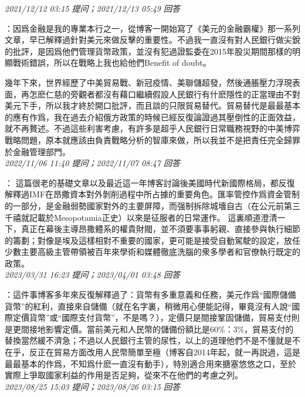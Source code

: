 \documentclass[twocolumn]{ctexart}
\begin{document}
\textit{\hfill\noindent\small 2021/12/12 03:15 提问；2021/12/13 05:49 回答}

：因爲金融是我的專業本行之一，從博客一開始寫了《美元的金融霸權》那一系列文章，早已解釋過針對美元來做反擊的重要性。不過我一直沒有對人民銀行做尖銳的批評，是因爲他們管理貨幣政策，並沒有犯過證監委在2015年股災期間那樣的明顯戰術錯誤，所以在戰略上我也給他們Benefit of doubt。

幾年下來，世界經歷了中美貿易戰、新冠疫情、美聯儲超發，然後通脹壓力浮現表面，再怎麽仁慈的旁觀者都沒有藉口繼續假設人民銀行有什麽隱性的正當理由不對美元下手，所以我才終於開口批評，而且談的只限貿易替代。貿易替代是最最基本的應有作爲，我在過去介紹俄方政策的時候已經反復論證過其壓倒性的正面效益，就不再贅述。不過這些利害考慮，有許多是超乎人民銀行日常職務視野的中美博弈戰略問題，原本就應該由負責戰略分析的智庫來做，所以我並不是把責任完全歸罪於金融管理部門。
\\

\textit{\hfill\noindent\small 2022/11/06 11:40 提问；2022/11/07 08:47 回答}

：
這篇很老的基礎文章以及最近這一年博客討論後美國時代新國際格局，都反復解釋過IMF在昂撒資本對外剝削過程中所占據的重要角色。匯率管控作爲資金管制的一部分，是金融弱勢國家對外的主要屏障，而强制拆除城墻自古（在公元前第三千禧就記載於Mesopotamia正史）以來是征服者的日常運作。
這裏順道澄清一下，真正在幕後主導昂撒體系的權貴財閥，並不須要事事躬親、直接參與執行細節的籌劃；對像是埃及這樣相對不重要的國家，更可能是接受自動駕駛的設定，放任少數主要高級主管帶領被百年來學術和媒體徹底洗腦的衆多學者和官僚執行既定的政策。
\\

\textit{\hfill\noindent\small 2023/03/31 16:23 提问；2023/04/01 03:48 回答}

：這件事博客多年來反復解釋過了：貨幣有多重意義和任務，美元作爲“國際儲備貨幣”的紅利，直接來自儲備（就在名字裏，稍微用心便能記得，畢竟沒有人說“國際定價貨幣”或“國際支付貨幣”，不是嗎？），定價只是間接鞏固儲備，貿易支付則是更間接地影響定價。當前美元和人民幣的儲備份額比是60\%：3\%，貿易支付的替換當然緩不濟急；不過以人民銀行主管的尿性，以上的道理他們不是不懂就是不在乎，反正在貿易方面改用人民幣簡單至極（博客自2014年起，就一再説過，這是最最基本的作爲，不知爲什麽一直沒有動手），特別適合用來搪塞悠悠之口，至於實際上爭取國家利益的作用是否足夠，從來不在他們的考慮之列。
\\

\textit{\hfill\noindent\small 2023/08/25 15:03 提问；2023/08/26 03:15 回答}
\end{document}
